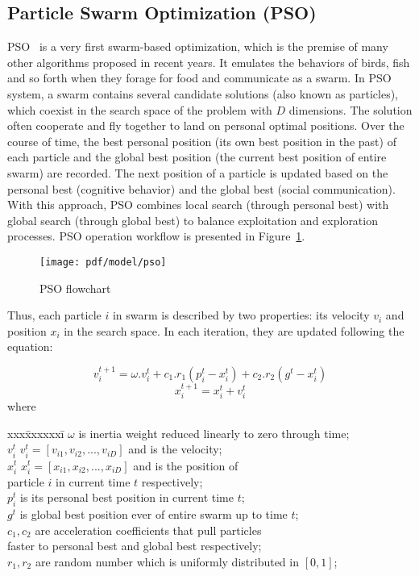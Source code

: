 \documentclass[../main.tex]{subfiles}
\begin{document}
\subsection{Particle Swarm Optimization (PSO)}
\label{pso_standard}
PSO~\cite{kennedy2010particle} is a very first swarm-based optimization, which is the premise of many other algorithms proposed in recent years. It emulates the behaviors of birds, fish and so forth when they forage for food and communicate as a swarm. In PSO system, a swarm contains several candidate solutions (also known as particles), which coexist in the search space of the problem with $D$ dimensions. The solution often cooperate and fly together to land on personal optimal positions. Over the course of time, the best personal position (its own best position in the past) of each particle and the global best position (the current best position of entire swarm) are recorded. The next position of a particle is updated based on the personal best (cognitive behavior) and the global best (social communication). With this approach, PSO combines local search (through personal best) with global search (through global best) to balance exploitation and exploration processes. PSO operation workflow is presented in Figure~\ref{fig_pso_algo}.
	 
\begin{figure}[!ht] 
   \centering
   \texttt{[image: pdf/model/pso]}
  \caption{PSO flowchart} 
  \label{fig_pso_algo} 
\end{figure}
	 
Thus, each particle $i$ in swarm is described by two properties: its velocity $v_i$ and position $x_i$ in the search space. In each iteration, they are updated following the equation: 

\begin{equation} \label{eq_pso_1}
v_i^{t+1} = \omega.v_i^t + c_1.r_1(p_i^t - x_i^t) + c_2.r_2(g^t - x_i^t)
\end{equation}
\begin{equation} \label{eq_pso_2}
x_i^{t+1} = x_i^t + v_i^t
\end{equation}
where 
\begin{tabbing}
	xxx\=xxxxxxi\=\kill
	\>	$\omega$			\>	is inertia weight reduced linearly to zero through time; \\
	\>	$v_i^t$			\>	$v_i^t = [v_{i1}, v_{i2}, ..., v_{iD}]$ and is the velocity;	\\
	\>	$x_i^t$			\>	$x_i^t = [x_{i1}, x_{i2}, ..., x_{iD}]$ and is the position of 	\\
	\> 	\phantom{inv}	\> 	particle $i$ in current time $t$ respectively;\\
	\>	$p_i^t$			\>	is its personal best position in current time $t$; \\
	\>	$g^t$			\>	is global best position ever of entire swarm up to time $t$; \\
	\>	$c_1, c_2$ 		\>	are acceleration coefficients that pull particles \\
	\>	\phantom{inv} 	\>	faster to personal best and global best respectively;\\
	\>	$r_1, r_2$ 		\>	are random number which is uniformly distributed in $[0,1]$; \\
\end{tabbing}
\end{document}
